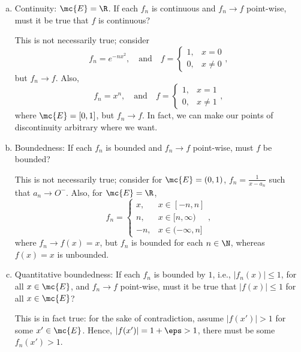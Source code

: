 \begin{enumerate}[(a)]
	\item Continuity: \(\mc{E}=\R\). If each \(f_n\) is continuous and \(f_n\to f\) point-wise, must it be true that \(f\) is continuous? 
	
	\medskip
	
	This is not necessarily true; consider 
	\begin{equation*}
		f_n=e^{-nx^2},\quad\text{and}\quad f=\begin{cases}
												1,&x=0\\
												0,&x\neq 0
											 \end{cases},
	\end{equation*}
	but \(f_n\to f\). Also,
	\begin{equation*}
		f_n=x^n,\quad\text{and}\quad f=\begin{cases}
											1,&x=1\\
											0,&x\neq 1
										\end{cases},
	\end{equation*} 
	where \(\mc{E}=[0,1]\), but \(f_n\to f\). In fact, we can make our points of discontinuity arbitrary where we want.
	
	\item Boundedness: If each \(f_n\) is bounded and \(f_n\to f\) point-wise, must \(f\) be bounded? 
	
	\medskip
	
	This is not necessarily true; consider for \(\mc{E}=(0,1)\), \(f_n=\displaystyle\frac{1}{x-a_n}\) such that \(a_n\to O^-\). Also, for \(\mc{E}=\R\), 
	\begin{equation*}
		f_n=\begin{cases}
				x,&x\in[-n,n]\\
				n,&x\in[n,\infty)\\
				-n,&x\in(-\infty,n]
			\end{cases},
	\end{equation*}
	where \(f_n\to f(x)=x\), but \(f_n\) is bounded for each \(n\in\N\), whereas \(f(x)=x\) is unbounded.
	
	\item Quantitative boundedness: If each \(f_n\) is bounded by \(1\), i.e., \(|f_n(x)|\leq 1\), for all \(x\in\mc{E}\), and \(f_n\to f\) point-wise, must it be true that \(|f(x)|\leq 1\) for all \(x\in\mc{E}\)?
	
	\medskip
	
	This is in fact true: for the sake of contradiction, assume \(|f(x')|>1\) for some \(x'\in\mc{E}\). Hence, \(|f(x')|=1+\eps>1\), there must be some \(f_n(x')>1\). 
	

\end{enumerate}
